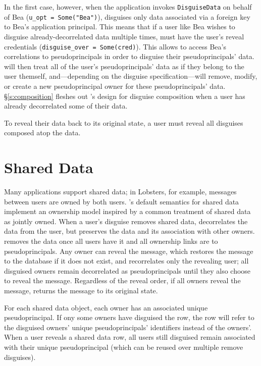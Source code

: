 In the first case, however, when the application invokes \texttt{DisguiseData}
on behalf of Bea (\texttt{u\_opt = Some("Bea")}), \sys disguises only data
associated via a foreign key to Bea's application principal.
%
This means that if a user like Bea wishes to disguise already-decorrelated data
multiple times, \sys must have the user's reveal credentials
(\texttt{disguise\_over = Some(cred)}). This allows \sys to access Bea's
correlations to pseudoprincipals in order to disguise their pseudoprincipals'
data.
%
\sys will then treat all of the user's pseudoprincipals' data as if they belong
to the user themself, and---depending on the disguise specification---will
remove, modify, or create a new pseudoprincipal owner for these
pseudoprincipals' data.
%
\S\ref{s:composition} fleshes out \sys's design for disguise composition when
a user has already decorrelated some of their data.

%
To reveal their data back to its original state, a user must reveal all
disguises composed atop the data.
%

\section{Shared Data}
Many applications support shared data; in Lobsters, for example, messages
between users are owned by both users.
%
\sys's default semantics for shared data implement an ownership model inspired
by a common treatment of shared data as jointly owned.
%
When a user's disguise removes shared data, \sys decorrelates the data from the
\xxing user, but preserves the data and its association with other owners.
%
\sys removes the data once all users have \xxed it and all ownership links are
to pseudoprincipals.
%
Any owner can reveal the message, which restores the message to the database if
it does not exist, and recorrelates only the revealing user; all disguised
owners remain decorrelated as pseudoprincipals until they also choose to reveal
the message.
%
Regardless of the reveal order, if all owners reveal the message, \sys returns
the message to its original state.
%

%
For each shared data object, each owner has an associated unique
pseudoprincipal. If ony some owners have disguised the row, the row will refer
to the disguised owners' unique pseudoprincipals' identifiers instead of the
owners'.
%
When a user reveals a shared data row, all users still disguised remain
associated with their unique pseudoprincipal (which can be reused over multiple
remove disguises).
%

